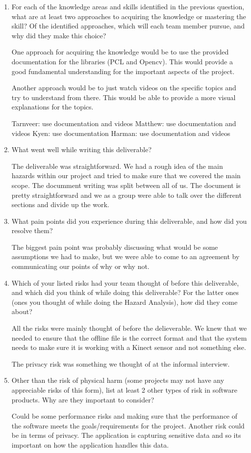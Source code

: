 \begin{enumerate}
\item For each of the knowledge areas and skills identified in the previous question, what are at least two approaches to acquiring the knowledge or mastering the skill?  Of the identified approaches, which
will each team member pursue, and why did they make this choice?

One approach for acquiring the knowledge would be to use the provided documentation for the libraries (PCL and Opencv). This would provide a good fundamental understanding for the important aspects of the project. 

Another approach would be to just watch videos on the specific topics and try to understand from there. This would be able to provide a more visual explanations for the topics.

Tarnveer: use documentation and videos
Matthew: use documentation and videos 
Kyen: use documentation
Harman: use documentation and videos

\item What went well while writing this deliverable? 

The deliverable was straightforward. We had a rough idea of the main hazards within our project and 
tried to make sure that we covered the main scope. The documment writing was split between all of us.
The document is pretty straightforward and we as a group were able to talk over the different sections
and divide up the work.

\item What pain points did you experience during this deliverable, and how
did you resolve them?

The biggest pain point was probably discussing what would be some assumptions we had to make, but we were able to come to an agreement by communicating our points of why or why not.

\item Which of your listed risks had your team thought of before this
deliverable, and which did you think of while doing this deliverable? For
the latter ones (ones you thought of while doing the Hazard Analysis), how
did they come about?

All the risks were mainly thought of before the delieverable. We knew that we needed to ensure that the 
offline file is the correct format and that the system needs to make sure it is working with a Kinect sensor and not something else.

The privacy risk was something we thought of at the informal interview.

\item Other than the risk of physical harm (some projects may not have any
appreciable risks of this form), list at least 2 other types of risk in
software products. Why are they important to consider?

Could be some performance risks and making sure that the performance of the software meets the goals/requirements for the project.
Another risk could be in terms of privacy. The application is capturing sensitive data and so its important on how the application handles this data.

\end{enumerate}